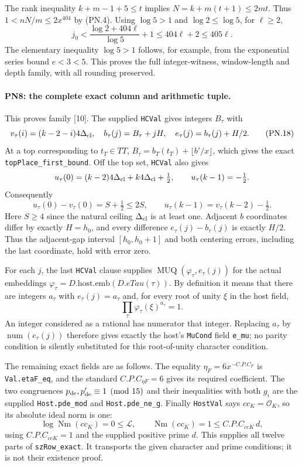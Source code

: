 The rank inequality $k+m-1+5\leq t$ implies
$N=k+m(t+1)\leq2mt$. Thus $1<nN/m\leq2x^{404}$ by (PN.4).
Using $\log5>1$ and $\log2\leq\log5$, for $\ell\geq2$,
\[
 j_0<\frac{\log2+404\ell}{\log5}+1
         \leq404\ell+2\leq405\ell.                         \tag{PN.17}
\]
The elementary inequality $\log5>1$ follows, for example, from the
exponential series bound $e<3<5$. This proves the full integer-witness,
window-length and depth family, with all rounding preserved.

\paragraph{PN8: the complete exact column and arithmetic tuple.}
This proves family [10]. The supplied \texttt{HCVal} gives integers
$B_\tau$ with
\[
 v_\tau(i)=(k-2-i)4\Delta_{\rm cl},\quad
 b_\tau(j)=B_\tau+jH,\quad e_\tau(j)=b_\tau(j)+H/2.      \tag{PN.18}
\]
At a top corresponding to $t_T\in TT$,
$B_\tau=b_T(t_T)+\lfloor b'/x\rfloor$, which gives the exact
\texttt{topPlace\_first\_bound}. Off the top set, \texttt{HCVal}
also gives
\[
 u_\tau(0)=(k-2)4\Delta_{\rm cl}+k4\Delta_{\rm cl}+\tfrac12,
 \qquad u_\tau(k-1)=-\tfrac12.
\]
Consequently
\[
 u_\tau(0)-v_\tau(0)=S+\tfrac12\leq2S,
 \qquad u_\tau(k-1)=v_\tau(k-2)-\tfrac12.                 \tag{PN.19}
\]
Here $S\geq4$ since the natural ceiling $\Delta_{\rm cl}$ is at
least one. Adjacent $b$ coordinates differ by exactly $H=h_0$, and
every difference $e_\tau(j)-b_\tau(j)$ is exactly $H/2$.
Thus the adjacent-gap interval $[h_0,h_0+1]$ and both centering
errors, including the last coordinate, hold with error zero.

For each $j$, the last \texttt{HCVal} clause supplies
$\operatorname{MUQ}(\varphi_\tau,e_\tau(j))$ for the actual embeddings
$\varphi_\tau=D.\mathrm{host}.\mathrm{emb}(D.eTau(\tau))$.
By definition it means that there are integers $a_\tau$ with
$e_\tau(j)=a_\tau$ and, for every root of unity $\xi$ in the host field,
\[
                    \prod_\tau\varphi_\tau(\xi)^{a_\tau}=1.
                                                               \tag{PN.20}
\]
An integer considered as a rational has numerator that integer.
Replacing $a_\tau$ by $\operatorname{num}(e_\tau(j))$ therefore gives
exactly the host's \texttt{MuCond} field \texttt{e\_mu}; no parity
condition is silently substituted for this root-of-unity character
condition.

The remaining exact fields are as follows. The equality
$\eta_F=6x^{-C.P.C_F}$ is \texttt{Val.etaF\_eq}, and the standard
$C.P.C_{\eta F}=6$ gives its required coefficient. The two congruences
$p_{\rm de},p'_{\rm de}\equiv1\pmod{15}$ and their inequalities with
both $g_i$ are the supplied \texttt{Host.pde\_mod} and
\texttt{Host.pde\_ne\_g}. Finally \texttt{HostVal} says
$cc_K=\mathcal O_K$, so its absolute ideal norm is one:
\[
       \log\operatorname{Nm}(cc_K)=0\leq\mathcal L,
       \qquad \operatorname{Nm}(cc_K)=1\leq C.P.C_{ccK}\,d,
                                                               \tag{PN.21}
\]
using $C.P.C_{ccK}=1$ and the supplied positive prime $d$.
This supplies all twelve parts of \texttt{szRow\_exact}. It transports
the given character and prime conditions; it is not their existence proof.

